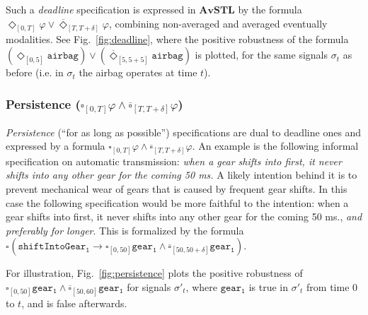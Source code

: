 \documentclass[envcountsect,orivec]{llncs} \usepackage{etex} \usepackage[]{graphicx}
\newcommand{\DiaOp}[1]{\Diamond_{#1}}
\newcommand{\BoxOp}[1]{\square_{#1}}
\newcommand{\TDiaOp}[1]{\overline{\Diamond}_{#1}}
\newcommand{\TBoxOp}[1]{\overline{\square}_{#1}}
\newcommand{\AvSTL}{\textbf{AvSTL}}
\begin{document}
Such
a \emph{deadline} specification is expressed in $\AvSTL$ by the formula 
$\DiaOp{[0,T]}\varphi \lor \TDiaOp{[T,T+\delta]}\varphi$, 
combining non-averaged and averaged
eventually modalities. See Fig.~\ref{fig:deadline}, where the
positive robustness of the formula
\begin{math}
 (\DiaOp{[0,5]}\mathtt{airbag})\lor
   (\TDiaOp{[5,5+5]}\mathtt{airbag})
\end{math}
is plotted, for the same signals $\sigma_{t}$ as before 
(i.e. in $\sigma_{t}$ the airbag operates at time $t$).

























\subsubsection{Persistence
   ($\BoxOp{[0,T]}\varphi\land\TBoxOp{[T,T+\delta]}\varphi$)}
\emph{Persistence} (``for as long as possible'') specifications are dual
to deadline ones and expressed by a formula
$\BoxOp{[0,T]}\varphi\land\TBoxOp{[T,T+\delta]}\varphi$. An example is
the following informal specification on automatic transmission:
\emph{when a gear shifts into first,
it never shifts into any other gear for the coming 50 ms.} A likely
intention behind it is to prevent mechanical wear of gears that is caused by
frequent gear shifts. In this case the following specification 
would be more faithful to the intention: when a gear shifts into first,
it never shifts into any other gear for the coming 50 ms., \emph{and
preferably for longer}. This is formalized by the formula
\begin{math}
    \BoxOp{} 
    (
    \mathtt{shiftIntoGear_1} \to
\BoxOp{[0,50]}\mathtt{gear_1}\land\TBoxOp{[50,50+\delta]}\mathtt{gear_1}
)
\end{math}.

For illustration, Fig.~\ref{fig:persistence} plots
the positive robustness of
$\BoxOp{[0,50]}\mathtt{gear_1}\land\TBoxOp{[50,60]}\mathtt{gear_1}$
for signals $\sigma'_{t}$, where $\mathtt{gear_1}$ is true  in
$\sigma'_{t}$ from time $0$ to $t$, and is false afterwards.
\end{document}
